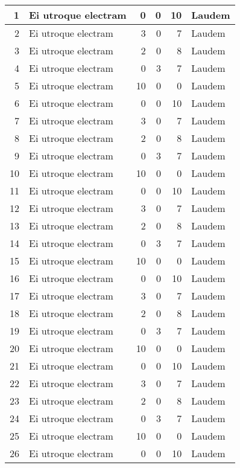 \begin{small}
\begin{longtable}[c]{|r|l|r|r|r|l|}
1   & Ei utroque electram & 0  & 0  & 10 & Laudem  \\ \hline
2   & Ei utroque electram & 3  & 0  & 7  & Laudem  \\ \hline
3   & Ei utroque electram & 2  & 0  & 8  & Laudem  \\ \hline
4   & Ei utroque electram & 0  & 3  & 7  & Laudem  \\ \hline
5   & Ei utroque electram & 10 & 0  & 0  & Laudem  \\ \hline
6   & Ei utroque electram & 0  & 0  & 10 & Laudem  \\ \hline
7   & Ei utroque electram & 3  & 0  & 7  & Laudem  \\ \hline
8   & Ei utroque electram & 2  & 0  & 8  & Laudem  \\ \hline
9   & Ei utroque electram & 0  & 3  & 7  & Laudem  \\ \hline
10   & Ei utroque electram & 10 & 0  & 0  & Laudem  \\ \hline
11   & Ei utroque electram & 0  & 0  & 10 & Laudem  \\ \hline
12   & Ei utroque electram & 3  & 0  & 7  & Laudem  \\ \hline
13   & Ei utroque electram & 2  & 0  & 8  & Laudem  \\ \hline
14   & Ei utroque electram & 0  & 3  & 7  & Laudem  \\ \hline
15   & Ei utroque electram & 10 & 0  & 0  & Laudem  \\ \hline
16   & Ei utroque electram & 0  & 0  & 10 & Laudem  \\ \hline
17   & Ei utroque electram & 3  & 0  & 7  & Laudem  \\ \hline
18   & Ei utroque electram & 2  & 0  & 8  & Laudem  \\ \hline
19   & Ei utroque electram & 0  & 3  & 7  & Laudem  \\ \hline
20   & Ei utroque electram & 10 & 0  & 0  & Laudem  \\ \hline
21   & Ei utroque electram & 0  & 0  & 10 & Laudem  \\ \hline
22   & Ei utroque electram & 3  & 0  & 7  & Laudem  \\ \hline
23   & Ei utroque electram & 2  & 0  & 8  & Laudem  \\ \hline
24   & Ei utroque electram & 0  & 3  & 7  & Laudem  \\ \hline
25   & Ei utroque electram & 10 & 0  & 0  & Laudem  \\ \hline
26   & Ei utroque electram & 0  & 0  & 10 & Laudem  \\ \hline

\end{longtable}
\end{small}
